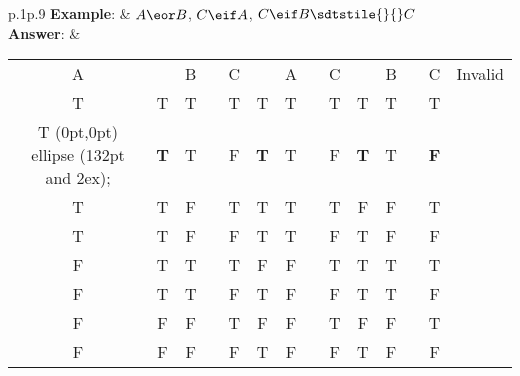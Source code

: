 \begin{longtabu}{p{.1\linewidth}p{.9\linewidth}}
\textbf{Example}: & $A \eor B$, $C \eif A$, $C \eif B \sdtstile{}{} C$   \\
\textbf{Answer}: & \begin{tabular}[t]{cccccccccccccc}
A	&	\eor	&	B	&	&	C	&	\eif	&	A	&	&	C	&	\eif	&	B	&	&	C	&	Invalid	\\
\cline{1-3} \cline{5-7}	\cline{9-11}	\cline{13-13}
T	&	T		&	T	&	&	T	&	T		&	T	&	&	T	&	T		&	T	&	&	T	&	\\

T \tikz[overlay, shift={(100pt,1ex)}, gray] \draw (0pt,0pt) ellipse (132pt and 2ex);	&	\textbf{T}		&	T	&	&	F	&	\textbf{T}		&	T	&	&	F	&	\textbf{T}		&	T	&	&	\textbf{F}	&	\\

T	&	T		&	F	&	&	T	&	T		&	T	&	&	T	&	F		&	F	&	&	T	&	\\
T	&	T		&	F	&	&	F	&	T		&	T	&	&	F	&	T		&	F	&	&	F	&	\\
F	&	T		&	T	&	&	T	&	F		&	F	&	&	T	&	T		&	T	&	&	T	&	\\
F	&	T		&	T	&	&	F	&	T		&	F	&	&	F	&	T		&	T	&	&	F	&	\\
F	&	F		&	F	&	&	T	&	F		&	F	&	&	T	&	F		&	F	&	&	T	&	\\
F	&	F		&	F	&	&	F	&	T		&	F	&	&	F	&	T		&	F	&	&	F	&	\\						
\end{tabular}\\
\end{longtabu}


